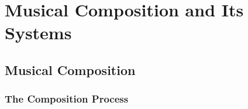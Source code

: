 \begin{comment}
           
            As music is already embedded within the culture of modern society either through the entertainment it brings \citep{hawkins2013pac,donnelly2005spectre} or the benefits it has on psychological health \citep{kemper2005music}, focus group discussion on music can bring interactions between a wide variety of individuals due to the familiarity of music.     
            
            Composers are personal with their music and each composition has a special standard stemming from the background of the composer \citep{rothgeb1975strict,miller1984genre}. However, it was found in the study of \citet{folstad2008effect} that group discussions yielded better results for usability inspection and evaluation compared to individual inspection. This potentially means that focus group discussion conducted with multiple composers would yield more ideas and better results.
            
            \end{comment}
            
            

\section{Musical Composition and Its Systems}
	\subsection{Musical Composition}
    	\subsubsection{The Composition Process}
       
